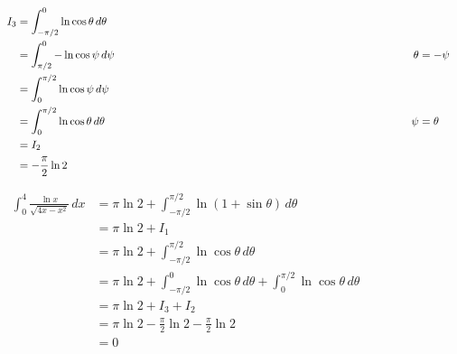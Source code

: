 \documentclass{article}
\newcommand{\explnspaceiv}{\hspace{3.61in}}
\begin{document}
\\ \\
\par\noindent
{
\setlength{\abovedisplayskip}{0pt}
\begin{fleqn}
\begin{alignat*}{2}
I_3 & = \int_{-\pi / 2}^{0} \ln \cos \theta \, d\theta \\
& = \int_{\pi / 2}^{0} -\ln \cos \psi \, d\psi & \explnspaceiv \theta & = -\psi \\
& = \int_{0}^{\pi / 2} \ln \cos \psi \, d\psi \\
& = \int_{0}^{\pi / 2} \ln \cos \theta \, d\theta & \explnspaceiv \psi & = \theta \\
& = I_2 \\
& = -\frac{\pi}{2} \ln 2
\end{alignat*}
\end{fleqn}
}
\par\noindent
$\begin{aligned}
\int_{0}^{4} \frac{\ln{x}}{\sqrt{4x - x^2}} \, dx & = \pi \ln 2 + \int_{-\pi / 2}^{\pi / 2} \ln (1 + \sin \theta) \, d\theta \\
& = \pi \ln 2 + I_1 \\
& = \pi \ln 2 + \int_{-\pi /2 }^{\pi / 2} \ln \cos \theta \, d\theta \\
& = \pi \ln 2 + \int_{-\pi / 2}^{0} \ln \cos \theta \, d\theta + \int_{0}^{\pi / 2} \ln \cos \theta \, d\theta \\
& = \pi \ln 2 + I_3 + I_2 \\
& = \pi \ln 2 - \frac{\pi}{2} \ln 2 - \frac{\pi}{2} \ln 2 \\
& = 0
\end{aligned}$
\end{document}
